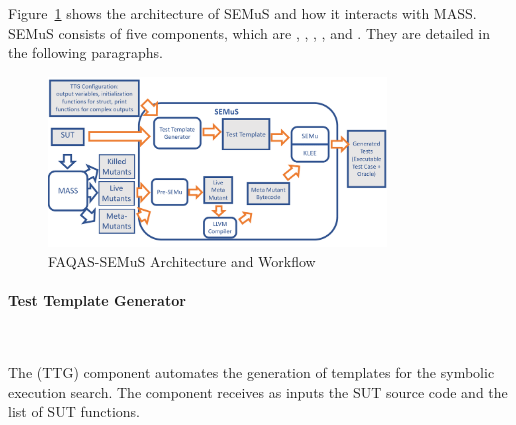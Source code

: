 




Figure~\ref{fig:semus_architecture} shows the architecture of SEMuS and how it interacts with MASS. SEMuS consists of five components, which are ,  ,  ,  , and .
They are detailed in the following paragraphs.

\begin{figure}[h]
\begin{center}
\includegraphics[width=0.8\textwidth]{images/semus-architecture2}
\caption{FAQAS-SEMuS Architecture and Workflow}
\label{fig:semus_architecture}
\end{center}
\end{figure}


\paragraph{Test Template Generator}\ 

The  (TTG) component automates the generation of templates for the symbolic execution search. The component receives as inputs the SUT source code and the list of SUT functions. 

